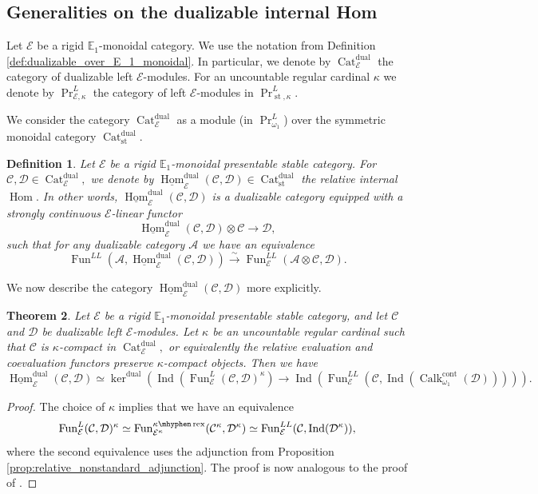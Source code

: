 \documentclass[11pt,leqno]{amsart}
\newtheorem{theo}{Theorem}[section]
\newtheorem{defi}[theo]{Definition}
\numberwithin{equation}{section}
\def\Hom{\operatorname{Hom}}
\newcommand{\hy}{\mhyphen}
\newcommand{\xto}{\xrightarrow}
\newcommand{\rex}{\operatorname{rex}}
\newcommand{\Cat}{\operatorname{Cat}}
\newcommand{\cont}{\operatorname{cont}}
\newcommand{\st}{\operatorname{st}}
\newcommand{\dual}{\operatorname{dual}}
\newcommand{\bE}{{\mathbb E}}
\newcommand{\cD}{{\mathcal D}}
\newcommand{\cA}{{\mathcal A}}
\newcommand{\cC}{{\mathcal C}}
\newcommand{\cE}{{\mathcal E}}
\newcommand{\un}{\underline}
\newcommand{\Fun}{\operatorname{Fun}}
\newcommand{\Ind}{\operatorname{Ind}}
\newcommand{\Calk}{\operatorname{Calk}}
\begin{document}
\subsection{Generalities on the dualizable internal Hom}

Let $\cE$ be a rigid $\bE_1$-monoidal category. We use the notation from Definition \ref{def:dualizable_over_E_1_monoidal}. In particular, we denote by $\Cat_{\cE}^{\dual}$ the category of dualizable left $\cE$-modules. For an uncountable regular cardinal $\kappa$ we denote by $\Pr^L_{\cE,\kappa}$ the category of left $\cE$-modules in $\Pr^L_{\st,\kappa}.$

We consider the category $\Cat_{\cE}^{\dual}$ as a module (in $\Pr^L_{\omega_1}$) over the symmetric monoidal category $\Cat_{\st}^{\dual}.$

\begin{defi}Let $\cE$ be a rigid $\bE_1$-monoidal presentable stable category. For $\cC,\cD\in\Cat_{\cE}^{\dual},$ we denote by $\un{\Hom}_{\cE}^{\dual}(\cC,\cD)\in\Cat_{\st}^{\dual}$ the relative internal $\Hom.$ In other words, $\un{\Hom}_{\cE}^{\dual}(\cC,\cD)$ is a dualizable category equipped with a strongly continuous $\cE$-linear functor
$$\un{\Hom}_{\cE}^{\dual}(\cC,\cD)\otimes \cC\to\cD,$$ such that for any dualizable category $\cA$ we have an equivalence
$$\Fun^{LL}(\cA,\un{\Hom}_{\cE}^{\dual}(\cC,\cD))\xto{\sim} \Fun^{LL}_{\cE}(\cA\otimes\cC,\cD).$$\end{defi}

We now describe the category $\un{\Hom}_{\cE}^{\dual}(\cC,\cD)$ more explicitly.

\begin{theo}\label{th:descr_Hom^dual}
	Let $\cE$ be a rigid $\bE_1$-monoidal presentable stable category, and let $\cC$ and $\cD$ be dualizable left $\cE$-modules. Let $\kappa$ be an uncountable regular cardinal such that $\cC$ is $\kappa$-compact in $\Cat_{\cE}^{\dual},$ or equivalently the relative evaluation and coevaluation functors preserve $\kappa$-compact objects. Then we have $$\un{\Hom}_{\cE}^{\dual}(\cC,\cD)\simeq \ker^{\dual}(\Ind(\Fun_{\cE}^L(\cC,\cD)^{\kappa})\to \Ind(\Fun_{\cE}^{LL}(\cC,\Ind(\Calk^{\cont}_{\omega_1}(\cD))))).$$	
\end{theo}

\begin{proof}
The choice of $\kappa$ implies that we have an equivalence
\begin{equation*}
\Fun^L_{\cE}(\cC,\cD)^{\kappa}\simeq \Fun_{\cE^{\kappa}}^{\kappa\hy\rex}(\cC^{\kappa},\cD^{\kappa})\simeq \Fun_{\cE}^{LL}(\cC,\Ind(\cD^{\kappa})),
\end{equation*}
where the second equivalence uses the adjunction from Proposition \ref{prop:relative_nonstandard_adjunction}. The proof is now analogous to the proof of \cite[Theorem 1.91]{E24}.
\end{proof}
\end{document}
